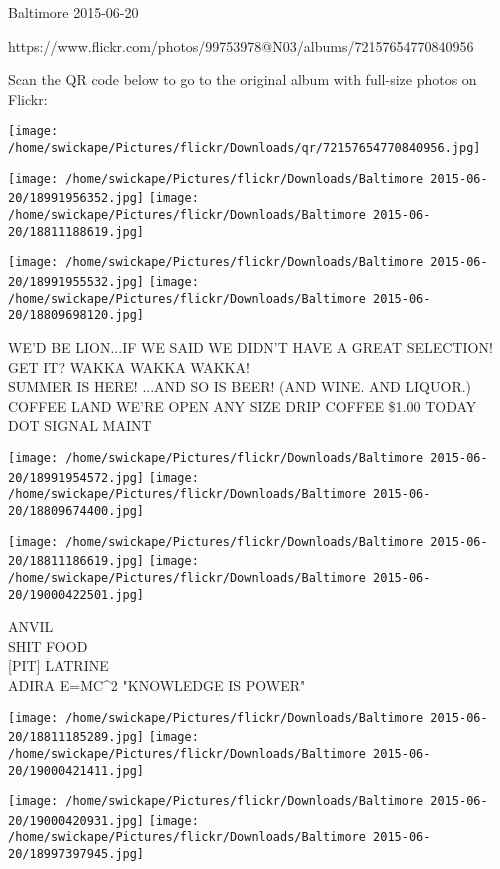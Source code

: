 \documentclass[10pt,letterpaper]{article}
\begin{document}
Baltimore 2015-06-20

https://www.flickr.com/photos/99753978@N03/albums/72157654770840956

Scan the QR code below to go to the original album with full-size photos on Flickr:

\texttt{[image: /home/swickape/Pictures/flickr/Downloads/qr/72157654770840956.jpg]}
\pagebreak

\texttt{[image: /home/swickape/Pictures/flickr/Downloads/Baltimore 2015-06-20/18991956352.jpg]}
\texttt{[image: /home/swickape/Pictures/flickr/Downloads/Baltimore 2015-06-20/18811188619.jpg]}

\texttt{[image: /home/swickape/Pictures/flickr/Downloads/Baltimore 2015-06-20/18991955532.jpg]}
\texttt{[image: /home/swickape/Pictures/flickr/Downloads/Baltimore 2015-06-20/18809698120.jpg]}

WE'D BE LION...IF WE SAID WE DIDN'T HAVE A GREAT SELECTION!  GET IT?  WAKKA WAKKA WAKKA!\\
SUMMER IS HERE!  ...AND SO IS BEER!  (AND WINE.  AND LIQUOR.)\\
COFFEE LAND WE'RE OPEN ANY SIZE DRIP COFFEE \$1.00 TODAY\\
DOT SIGNAL MAINT\\
\pagebreak

\texttt{[image: /home/swickape/Pictures/flickr/Downloads/Baltimore 2015-06-20/18991954572.jpg]}
\texttt{[image: /home/swickape/Pictures/flickr/Downloads/Baltimore 2015-06-20/18809674400.jpg]}

\texttt{[image: /home/swickape/Pictures/flickr/Downloads/Baltimore 2015-06-20/18811186619.jpg]}
\texttt{[image: /home/swickape/Pictures/flickr/Downloads/Baltimore 2015-06-20/19000422501.jpg]}

ANVIL\\
SHIT FOOD\\
{[}PIT{]} LATRINE\\
ADIRA E=MC\^{}2 "KNOWLEDGE IS POWER"\\
\pagebreak

\texttt{[image: /home/swickape/Pictures/flickr/Downloads/Baltimore 2015-06-20/18811185289.jpg]}
\texttt{[image: /home/swickape/Pictures/flickr/Downloads/Baltimore 2015-06-20/19000421411.jpg]}

\texttt{[image: /home/swickape/Pictures/flickr/Downloads/Baltimore 2015-06-20/19000420931.jpg]}
\texttt{[image: /home/swickape/Pictures/flickr/Downloads/Baltimore 2015-06-20/18997397945.jpg]}
\end{document}
